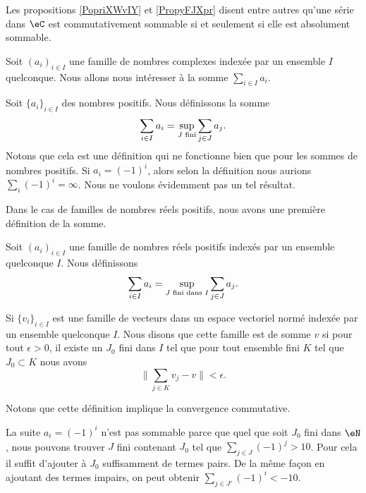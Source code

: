 Les propositions \ref{PopriXWvIY} et \ref{PropyFJXpr} disent entre autres qu'une série dans \( \eC\) est commutativement sommable si et seulement si elle est absolument sommable.

Soit \( (a_i)_{i\in I}\) une famille de nombres complexes indexée par un ensemble \( I\) quelconque. Nous allons nous intéresser à la somme \( \sum_{i\in I}a_i\).


Soit \( \{ a_i \}_{i\in I}\) des nombres positifs. Nous définissons la somme
\begin{equation}
    \sum_{i\in I}a_i=\sup_{\text{\( J\) fini}}\sum_{j\in J}a_j.
\end{equation}
Notons que cela est une définition qui ne fonctionne bien que pour les sommes de nombres positifs. Si \( a_i=(-1)^i\), alors selon la définition nous aurions \( \sum_i(-1)^i=\infty\). Nous ne voulons évidemment pas un tel résultat.

Dans le cas de familles de nombres réels positifs, nous avons une première définition de la somme. 
\begin{definition}  \label{DefHYgkkA}
Soit \( (a_i)_{i\in I}\) une famille de nombres réels positifs indexés par un ensemble quelconque \( I\). Nous définissons
\begin{equation}
    \sum_{i\in I}a_i=\sup_{\text{\( J\) fini dans \( I\)}}\sum_{j\in J}a_j.
\end{equation}
\end{definition}

\begin{definition}  \label{DefIkoheE}
    Si \( \{ v_i \}_{i\in I}\) est une famille de vecteurs dans un espace vectoriel normé indexée par un ensemble quelconque \( I\). Nous disons que cette famille est  de somme \( v\) si pour tout \( \epsilon>0\), il existe un \( J_0\) fini dans \( I\) tel que pour tout ensemble fini \( K\) tel que \( J_0\subset K\) nous avons
    \begin{equation}
        \| \sum_{j\in K}v_j-v \|<\epsilon.
    \end{equation}
\end{definition}
Notons que cette définition implique la convergence commutative.

\begin{example}
    La suite \( a_i=(-1)^i\) n'est pas sommable parce que quel que soit \( J_0\) fini dans \( \eN\), nous pouvons trouver \( J\) fini contenant \( J_0\) tel que \( \sum_{j\in J}(-1)^j>10\). Pour cela il suffit d'ajouter à \( J_0\) suffisamment de termes pairs. De la même façon en ajoutant des termes impairs, on peut obtenir \( \sum_{j\in J'}(-1)^i<-10\).
\end{example}

